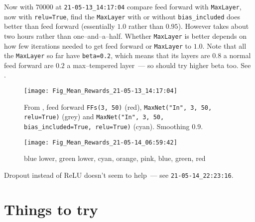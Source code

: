 \documentclass[12pt]{article}
\begin{document}
Now with $\num{70000}$ at \verb|21-05-13_14:17:04| compare feed forward with \verb|MaxLayer|, now with \verb|relu=True|, find the \verb|MaxLayer| with or without \verb|bias_included| does better than feed forward (essentially $1.0$ rather than $0.95$).  However takes about two hours rather than one--and--a--half.  Whether \verb|MaxLayer| is better depends on how few iterations needed to get feed forward or \verb|MaxLayer| to $1.0$.  Note that all the \verb|MaxLayer| so far have \verb|beta=0.2|, which means that its layers are $0.8$ a normal feed forward are $0.2$ a max--tempered layer~--- so should try higher beta too.  See .
\begin{figure}
	\centering
	\texttt{[image: Fig\_Mean\_Rewards\_21-05-13\_14:17:04]}
	\caption{From , feed forward \texttt{FFs(3, 50)} (red), \texttt{MaxNet("In", 3, 50, relu=True)} (grey) and \texttt{MaxNet("In", 3, 50, bias\_included=True, relu=True)} (cyan).  Smoothing 0.9.}
	\label{fig:figmeanrewards21-05-13141704}
\end{figure}
\begin{figure}
	\centering
	\texttt{[image: Fig\_Mean\_Rewards\_21-05-14\_06:59:42]}
	\caption{blue lower, green lower, cyan, orange, pink, blue, green, red}
	\label{fig:figmeanrewards21-05-14065942}
\end{figure}

Dropout instead of ReLU doesn't seem to help~--- see \verb|21-05-14_22:23:16|.

\section{Things to try}
\end{document}

